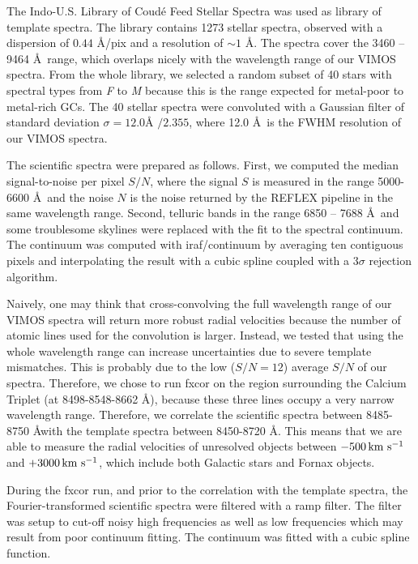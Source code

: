 \documentclass[useAMS,usenatbib]{mn2e}
\newcommand{\kms}{\mbox{\,km~s$^{-1}$}}
\begin{document}
The Indo-U.S. Library of Coud\'e Feed Stellar Spectra \citep{Valdes04} was used as library of template spectra. The library contains 1273 stellar spectra, observed with a dispersion of $0.44$ \AA /pix and a resolution of $\sim 1$ \AA . The spectra cover the 3460 -- 9464 \AA\ range, which overlaps nicely with the wavelength range of our VIMOS spectra. From the whole library, we selected a random subset of 40 stars with spectral types from \textit{F} to \textit{M} because this is the range expected for metal-poor to metal-rich GCs. The 40 stellar spectra were convoluted with a Gaussian filter of standard deviation $\sigma = 12.0\mbox{\AA\ } / 2.355$, where 12.0 \AA\ is the FWHM resolution of our VIMOS spectra. 

The scientific spectra were prepared as follows. First, we computed the median signal-to-noise per pixel $S/N$, where the signal $S$ is measured in the range 5000-6600 \AA\ and the noise $N$ is the noise returned by the REFLEX pipeline in the same wavelength range. Second, telluric bands in the range 6850 -- 7688 \AA\ and some troublesome skylines were replaced with the fit to the spectral continuum. The continuum was computed with iraf/continuum by averaging ten contiguous pixels and interpolating the result with a cubic spline coupled with a $3\sigma$ rejection algorithm.  

Naively, one may think that cross-convolving the full wavelength range of our VIMOS spectra will return more robust radial velocities because the number of atomic lines used for the convolution is larger. Instead, we tested that using the whole wavelength range can increase uncertainties due to severe template mismatches. This is probably due to the low ($S/N = 12$) average $S/N$ of our spectra. Therefore, we chose to run fxcor on the region surrounding the Calcium Triplet (at 8498-8548-8662 \AA), because these three lines occupy a very narrow wavelength range. Therefore, we correlate the scientific spectra between 8485-8750 \AA with the template spectra between 8450-8720 \AA . This means that we are able to measure the radial velocities of unresolved objects between $-500 \kms$ and $+3000\kms$, which include both Galactic stars and Fornax objects.   

During the fxcor run, and prior to the correlation with the template spectra, the Fourier-transformed scientific spectra were filtered with a ramp filter. The filter was setup to cut-off noisy high frequencies as well as low frequencies which may result from poor continuum fitting. The continuum was fitted with a cubic spline function.
\end{document}
